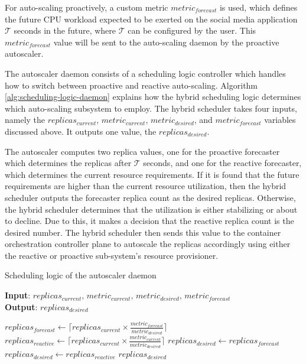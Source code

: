 For auto-scaling proactively, a custom metric $metric_{forecast}$ is used, which defines the future CPU workload expected to be exerted on the social media application $\mathcal{T}$ seconds in the future, where $\mathcal{T}$ can be configured by the user. This $metric_{forecast}$ value will be sent to the auto-scaling daemon by the proactive autoscaler.\par

The autoscaler daemon consists of a scheduling logic controller which handles how to switch between proactive and reactive auto-scaling. Algorithm \ref{alg:scheduling-logic-daemon} explains how the hybrid scheduling logic determines which auto-scaling subsystem to employ. The hybrid scheduler takes four inputs, namely the $replicas_{current}$, $metric_{current}$, $metric_{desired}$, and $metric_{forecast}$ variables discussed above. It outputs one value, the $replicas_{desired}$.\par

The autoscaler computes two replica values, one for the proactive forecaster which determines the replicas after $\mathcal{T}$ seconds, and one for the reactive forecaster, which determines the current resource requirements. If it is found that the future requirements are higher than the current resource utilization, then the hybrid scheduler outputs the forecaster replica count as the desired replicas. Otherwise, the hybrid scheduler determines that the utilization is either stabilizing or about to decline. Due to this, it makes a decision that the reactive replica count is the desired number. The hybrid scheduler then sends this value to the container orchestration controller plane to autoscale the replicas accordingly using either the reactive or proactive sub-system's resource provisioner.\par

\begin{algorithm}
    \caption{Scheduling logic of the autoscaler daemon}
    \label{alg:scheduling-logic-daemon}
    \textbf{Input}: $replicas_{current},\, metric_{current},\, metric_{desired},\, metric_{forecast}$\\
    \textbf{Output}: $replicas_{desired}$
    \begin{algorithmic}
        \State $replicas_{forecast} \gets \lceil replicas_{current} \times \frac{metric_{forecast}}{metric_{desired}}\rceil$
        \State $replicas_{reactive} \gets \lceil replicas_{current} \times \frac{metric_{current}}{metric_{desired}}\rceil$
            \State $replicas_{desired} \gets replicas_{forecast}$
        \Else
            \State $replicas_{desired} \gets replicas_{reactive}$
        \EndIf
        \State \Return $replicas_{desired}$
    \end{algorithmic}
\end{algorithm}

